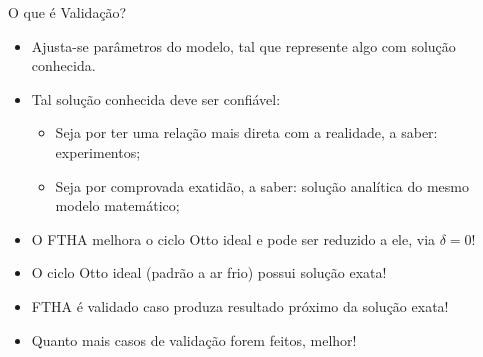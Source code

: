     \begin{frame}{O que é Validação?}\vspace*{-2em}
        \begin{itemize}
            \item<2-> Ajusta-se \alert{parâmetros} do modelo, tal que represente algo com
                \alert{solução conhecida}.
            \item<3-> Tal solução conhecida deve ser \alert{confiável}:
                \begin{itemize}
                    \item<4-> Seja por ter uma relação mais direta com a \alert{realidade}, a
                        saber: \alert{experimentos};
                    \item<5-> Seja por comprovada exatidão, a saber: \alert{solução analítica}
                        do mesmo \alert{modelo matemático};
                \end{itemize}
            \item<6-> O FTHA melhora o \alert{ciclo Otto ideal} e \alert{pode ser reduzido} a
                ele, via \alert{$\delta=0$}!
            \item<7-> O ciclo Otto ideal (padrão a ar frio) possui \alert{solução exata}!
            \item<8-> FTHA é validado caso produza \alert{resultado próximo} da solução exata!
            \item<9-> Quanto \alert{mais casos} de validação forem feitos, melhor!
        \end{itemize}
    \end{frame}

